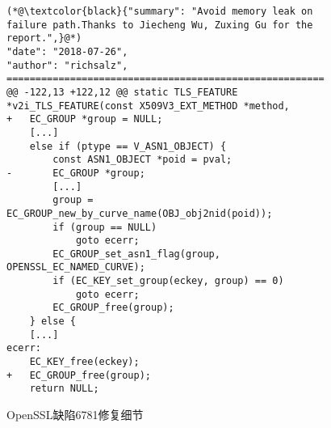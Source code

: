\begin{figure}[t]
	\centering
	\begin{lstlisting}
(*@\textcolor{black}{"summary": "Avoid memory leak on failure path.Thanks to Jiecheng Wu, Zuxing Gu for the report.",}@*)
"date": "2018-07-26",
"author": "richsalz",
=======================================================
@@ -122,13 +122,12 @@ static TLS_FEATURE *v2i_TLS_FEATURE(const X509V3_EXT_METHOD *method,
+   EC_GROUP *group = NULL;
	[...]
	else if (ptype == V_ASN1_OBJECT) {
		const ASN1_OBJECT *poid = pval;
-		EC_GROUP *group;
		[...]
		group = EC_GROUP_new_by_curve_name(OBJ_obj2nid(poid));
		if (group == NULL)
			goto ecerr;
		EC_GROUP_set_asn1_flag(group, OPENSSL_EC_NAMED_CURVE);
		if (EC_KEY_set_group(eckey, group) == 0)
			goto ecerr;
		EC_GROUP_free(group);
	} else {
	[...]
ecerr:
	EC_KEY_free(eckey);
+	EC_GROUP_free(group);
	return NULL;
	\end{lstlisting}
	\caption{
		OpenSSL缺陷6781修复细节
	}
	\label{fig:4-4-openssl-example-fix}
\end{figure}